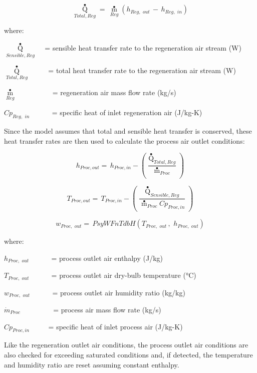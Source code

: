 \begin{equation}
{\mathop Q\limits^ \bullet_{Total,Reg}} = \,{\mathop m\limits^ \bullet_{Reg}}\left( {{h_{Reg,\,\,out}}\, - \,{h_{Reg,\,\,in}}} \right)
\end{equation}

where:

\({\mathop Q\limits^ \bullet_{Sensible,Reg}}\) ~ = sensible heat transfer rate to the regeneration air stream (W)

\({\mathop Q\limits^ \bullet_{Total,Reg}}\) ~~~~ = total heat transfer rate to the regeneration air stream (W)

\({\mathop m\limits^ \bullet_{Reg}}\) ~~~~~~~~~ = regeneration air mass flow rate (kg/s)

\(C{p_{Reg,\,\,in}}\) ~~~~~ = specific heat of inlet regeneration air (J/kg-K)

Since the model assumes that total and sensible heat transfer is conserved, these heat transfer rates are then used to calculate the process air outlet conditions:

\begin{equation}
{h_{Proc, out}} = \,{h_{Proc,in}} - \left( {\frac{{{{\mathop Q\limits^ \bullet  }_{Total,Reg}}}}{{{{\mathop m\limits^ \bullet  }_{Proc}}}}} \right)
\end{equation}

\begin{equation}
{T_{Proc, out}} = \,{T_{Proc,in}} - \left( {\frac{{{{\mathop Q\limits^ \bullet  }_{Sensible,Reg}}}}{{{{\mathop m\limits^ \bullet  }_{Proc}}C{p_{Proc,in}}}}} \right)
\end{equation}

\begin{equation}
{w_{Proc,\,\,out}} = \,PsyWFnTdbH\left( {{T_{Proc,\,\,out}}\,,\,\,{h_{Proc,\,\,out}}} \right)
\end{equation}

where:

\({h_{Proc,\,\,out}}\) ~~~~~ = process outlet air enthalpy (J/kg)

\({T_{Proc,\,\,out}}\) ~~~~~ = process outlet air dry-bulb temperature (°C)

\({w_{Proc,\,\,out}}\) ~~~~~ = process outlet air humidity ratio (kg/kg)

\({\dot m_{Proc}}\) ~~~~~~~~ = process air mass flow rate (kg/s)

\(C{p_{Proc,in}}\) ~~~~ = specific heat of inlet process air (J/kg-K)

Like the regeneration outlet air conditions, the process outlet air conditions are also checked for exceeding saturated conditions and, if detected, the temperature and humidity ratio are reset assuming constant enthalpy.

